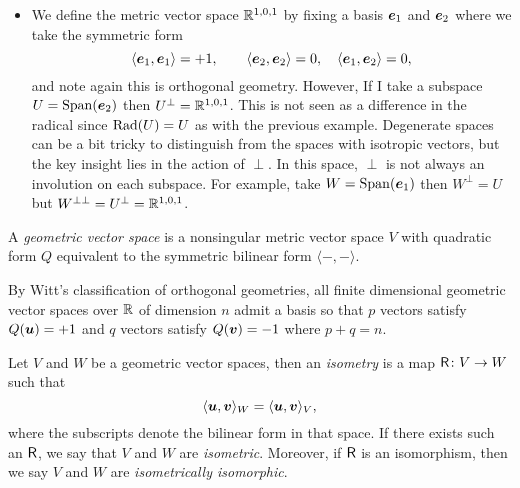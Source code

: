 \begin{example}
\begin{itemize}
    \item We define the metric vector space $\mathbb{R}^{1,0,1}$ by fixing a basis $\boldsymbol{e}_1$ and $\boldsymbol{e}_2$ where we take the symmetric form
    \begin{equation}
        \langle \boldsymbol{e}_1, \boldsymbol{e}_1 \rangle = +1, \qquad \langle \boldsymbol{e}_2, \boldsymbol{e}_2 \rangle = 0, \quad \langle \boldsymbol{e}_1,\boldsymbol{e}_2 \rangle = 0,
    \end{equation}
    and note again this is orthogonal geometry. However, If I take a subspace $U=\operatorname{Span} (\boldsymbol{e}_2)$ then $U^\perp = \mathbb{R}^{1,0,1}$. This is not seen as a difference in the radical since $\operatorname{Rad}(U)=U$ as with the previous example. Degenerate spaces can be a bit tricky to distinguish from the spaces with isotropic vectors, but the key insight lies in the action of $\perp$. In this space, $\perp$ is not always an involution on each subspace. For example, take $W=\operatorname{Span}(\boldsymbol{e}_1)$ then $W^\perp =  U$ but $W^{\perp \perp}= U^\perp = \mathbb{R}^{1,0,1}$. 
\end{itemize}
\end{example}

\begin{definition}
A \emph{geometric vector space} is a nonsingular metric vector space $V$ with quadratic form $Q$ equivalent to the symmetric bilinear form $\langle -,-\rangle$.
\end{definition}

By Witt's classification of orthogonal geometries, all finite dimensional geometric vector spaces over $\mathbb{R}$ of dimension $n$ admit a basis so that $p$ vectors satisfy $Q(\boldsymbol{u})=+1$ and $q$ vectors satisfy $Q(\boldsymbol{v})=-1$ where $p+q=n$. 

\begin{definition}
Let $V$ and $W$ be a geometric vector spaces, then an \emph{isometry} is a map $\mathsf{R} \colon V \to W$ such that
\begin{equation}
\langle \boldsymbol{u},\boldsymbol{v}\rangle_W = \langle \boldsymbol{u},\boldsymbol{v}\rangle_V,
\end{equation}
where the subscripts denote the bilinear form in that space. If there exists such an $\mathsf{R}$, we say that $V$ and $W$ are \emph{isometric}. Moreover, if $\mathsf{R}$ is an isomorphism, then we say $V$ and $W$ are \emph{isometrically isomorphic}.
\end{definition}